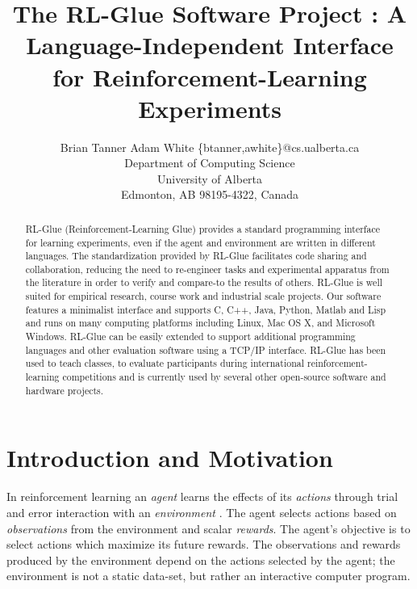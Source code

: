 \documentclass[twoside,11pt]{article}
\begin{document}
\title{The RL-Glue Software Project : A Language-Independent Interface for Reinforcement-Learning Experiments}


\author{\name Brian Tanner \AND Adam White  \email \{btanner,awhite\}@cs.ualberta.ca \\
       \addr Department of Computing Science\\
       University of Alberta\\
       Edmonton, AB 98195-4322, Canada}


\maketitle

\begin{abstract}%
RL-Glue (Reinforcement-Learning Glue) provides a standard programming interface for learning experiments, even if the agent and environment are written in different languages. 
The standardization provided by RL-Glue facilitates code sharing and collaboration, reducing the need to re-engineer tasks and experimental apparatus from the literature in order to verify and compare-to the results of others.
RL-Glue is well suited for empirical research, course work and industrial scale projects. Our software features a minimalist interface and supports C, C++, Java, Python, Matlab and Lisp and runs on many computing platforms including Linux, Mac OS X, and Microsoft Windows. RL-Glue can be easily extended to support additional programming languages and other evaluation software using a TCP/IP interface. RL-Glue has been used to teach classes, to evaluate participants during international reinforcement-learning competitions and is currently used by several other open-source software and hardware projects.
\end{abstract}

\section{Introduction and Motivation}
In reinforcement learning an {\it agent} learns the effects of its {\it actions} through trial and error interaction with an {\it environment} \citep{rlbook, rlsurvey,ndp}. The agent selects actions based on {\it observations} from the environment and scalar {\it rewards}. The agent's objective is to select actions which maximize its future rewards. The observations and rewards produced by the environment depend on the actions selected by the agent; the environment is not a static data-set, but rather an interactive computer program.
\end{document}
